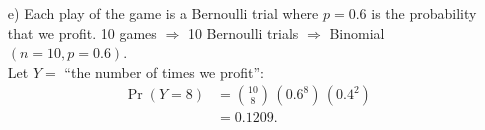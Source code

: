 \documentclass[12pt]{article}
\begin{document}
{\begin{minipage}[t]{0.98\textwidth}
\begin{minipage}[t]{0.47\textwidth}
\begin{enumerate}
    \begin{align*}
    \Pr(\text{we profit}) &= p(0) + p(0.5) \\&= 0.4 + 0.2 = 0.6.
    \end{align*}
$\Rightarrow$ If somebody plays our game, there is a $0.6$ probability that we profit.
\item[e)] Each play of the game is a Bernoulli trial where $p=0.6$ is the probability that we profit. 10 games $\Rightarrow$ 10 Bernoulli trials $\Rightarrow$ Binomial$(n=10,p=0.6)$.\\[0.2cm]
    Let $Y =$ ``the number of times we profit'':
    \begin{align*}
    \Pr(Y = 8) &= \binom{10}{8} \, (0.6^8) \, (0.4^2) \\&= 0.1209.
    \end{align*}
\end{enumerate}
\end{minipage}
\end{minipage}}\vspace{0.03\textwidth}
\end{document}

